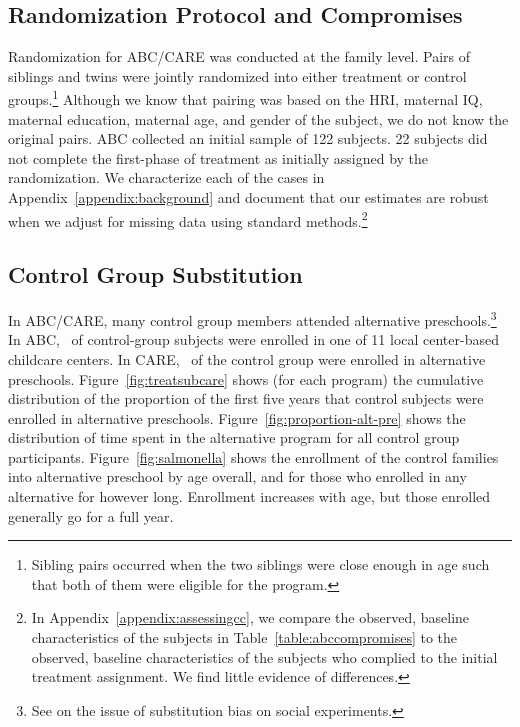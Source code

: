 \subsection{Randomization Protocol and Compromises} \label{section:randomization}

Randomization for ABC/CARE was conducted at the family level. Pairs of siblings and twins were jointly randomized into either treatment or control groups.\footnote{Sibling pairs occurred when the two siblings were close enough in age such that both of them were eligible for the program.} Although we know that pairing was based on the HRI, maternal IQ, maternal education, maternal age, and gender of the subject, we do not know the original pairs. ABC collected an initial sample of 122 subjects. 22 subjects did not complete the first-phase of treatment as initially assigned by the randomization. We characterize each of the cases in Appendix~\ref{appendix:background} and document that our estimates are robust when we adjust for missing data using standard methods.\footnote{In Appendix~\ref{appendix:assessingcc}, we compare the observed, baseline characteristics of the subjects in Table~\ref{table:abccompromises} to the observed, baseline characteristics of the subjects who complied to the initial treatment assignment. We find little evidence of differences.}

\subsection{Control Group Substitution}

In ABC/CARE, many control group members attended alternative preschools.\footnote{See \cite{Heckman_Hohmann_etal_2000_QJE} on the issue of substitution bias on social experiments.} In ABC, \treatsubsabc\ of control-group subjects were enrolled in one of 11 local center-based childcare centers. In CARE, \treatsubscarec\ of the control group were enrolled in alternative preschools. Figure~\ref{fig:treatsubcare} shows (for each program) the cumulative distribution of the proportion of the first five years that control subjects were enrolled in alternative preschools. Figure~\ref{fig:proportion-alt-pre} shows the distribution of time spent in the alternative program for all control group participants. Figure~\ref{fig:salmonella} shows the enrollment of the control families into alternative preschool by age overall, and for those who enrolled in any alternative for however long. Enrollment increases with age, but those enrolled generally go for a full year.

